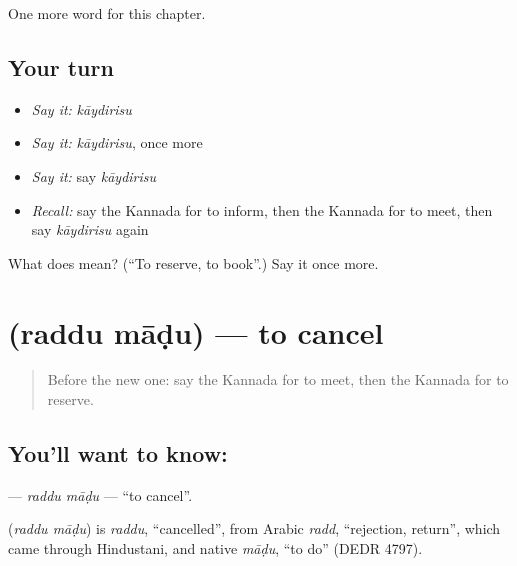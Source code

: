 \begin{grammarlens}[title={What you've built}]
One more word for this chapter.
\end{grammarlens}

\subsection*{Your turn}
\begin{itemize}
\raggedright
  \item \emph{Say it:} \emph{kāydirisu}
  \item \emph{Say it:} \emph{kāydirisu}, once more
  \item \emph{Say it:} say \emph{kāydirisu}
  \item \emph{Recall:} say the Kannada for to inform, then the Kannada for to meet, then say \emph{kāydirisu} again
\end{itemize}

\begin{tcolorbox}[breakable,colback=teal!4,colframe=teal!35!black,title={Before you move on}]
What does  mean? (\textquotedblleft{}To reserve, to book\textquotedblright{}.) Say it once more.
\end{tcolorbox}
\section[\texorpdfstring{\kn{ರದ್ದು} \kn{ಮಾಡು} (raddu māḍu)}{ರದ್ದು ಮಾಡು (raddu māḍu)}]{  (raddu māḍu) — to cancel}

\label{lesson:KA-C161-raddu-madu}



\begin{quote}
Before the new one: say the Kannada for to meet, then the Kannada for to reserve.
\end{quote}

\subsection*{You'll want to know:  }
\textbf{ } — \emph{raddu māḍu} — \textquotedblleft{}to cancel\textquotedblright{}.

\begin{cousinweb}
\textbf{ } (\emph{raddu māḍu}) is \emph{raddu}, \textquotedblleft{}cancelled\textquotedblright{}, from Arabic \emph{radd}, \textquotedblleft{}rejection, return\textquotedblright{}, which came through Hindustani, and native \emph{māḍu}, \textquotedblleft{}to do\textquotedblright{} (DEDR 4797).
\end{cousinweb}

